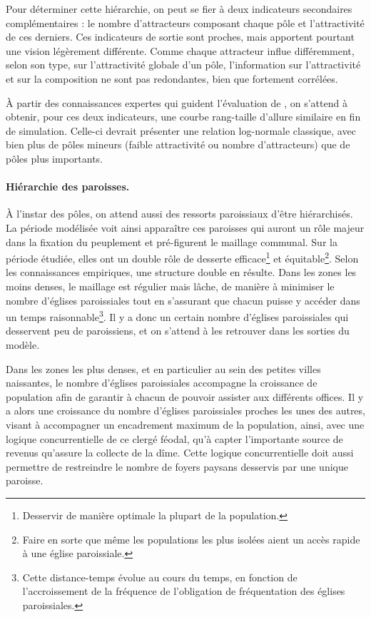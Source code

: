 Pour déterminer cette hiérarchie, on peut se fier à deux indicateurs secondaires complémentaires :
le nombre d'attracteurs composant chaque pôle et l'attractivité de ces derniers.
Ces indicateurs de sortie sont proches, mais apportent pourtant une vision légèrement différente.
Comme chaque attracteur influe différemment, selon son type, sur l'attractivité globale d'un pôle, l'information sur l'attractivité et sur la composition ne sont pas redondantes, bien que fortement corrélées.

À partir des connaissances expertes qui guident l'évaluation de \simfeodal{}, on s'attend à obtenir, pour ces deux indicateurs, une courbe rang-taille d'allure similaire en fin de simulation.
Celle-ci devrait présenter une relation log-normale classique, avec bien plus de pôles mineurs (faible attractivité ou nombre d'attracteurs) que de pôles plus importants.

\paragraph{Hiérarchie des paroisses.}\label{par:hierarchie-paroisses}

À l'instar des pôles, on attend aussi des ressorts paroissiaux d'être hiérarchisés.
La période modélisée voit ainsi apparaître ces paroisses qui auront un rôle majeur dans la fixation du peuplement et pré-figurent le maillage communal.
Sur la période étudiée, elles ont un double rôle de desserte efficace\footnote{
	Desservir de manière optimale la plupart de la population.
} et équitable\footnote{
	Faire en sorte que même les populations les plus isolées aient un accès rapide à une église paroissiale.
}.
Selon les connaissances empiriques, une structure double en résulte.
Dans les zones les moins denses, le maillage est régulier mais lâche, de manière à minimiser le nombre d'églises paroissiales tout en s'assurant que chacun puisse y accéder dans un temps raisonnable\footnote{
	Cette distance-temps évolue au cours du temps, en fonction de l'accroissement de la fréquence de l'obligation de fréquentation des églises paroissiales.
}.
Il y a donc un certain nombre d'églises paroissiales qui desservent peu de paroissiens, et on s'attend à les retrouver dans les sorties du modèle.

Dans les zones les plus denses, et en particulier au sein des petites villes naissantes, le nombre d'églises paroissiales accompagne la croissance de population afin de garantir à chacun de pouvoir assister aux différents offices.
Il y a alors une croissance du nombre d'églises paroissiales proches les unes des autres, visant à accompagner un encadrement maximum de la population, ainsi, avec une logique concurrentielle de ce clergé féodal, qu'à capter l'importante source de revenus qu'assure la collecte de la dîme.
Cette logique concurrentielle doit aussi permettre de restreindre le nombre de foyers paysans desservis par une unique paroisse.

